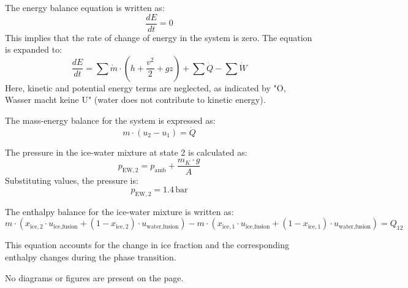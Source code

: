 The energy balance equation is written as:  
\[
\frac{dE}{dt} = 0
\]  
This implies that the rate of change of energy in the system is zero. The equation is expanded to:  
\[
\frac{dE}{dt} = \sum \dot{m} \cdot \left( h + \frac{v^2}{2} + gz \right) + \sum \dot{Q} - \sum \dot{W}
\]  
Here, kinetic and potential energy terms are neglected, as indicated by "O, Wasser macht keine U" (water does not contribute to kinetic energy).  

The mass-energy balance for the system is expressed as:  
\[
m \cdot (u_2 - u_1) = \dot{Q}
\]  

The pressure in the ice-water mixture at state 2 is calculated as:  
\[
p_{\text{EW},2} = p_{\text{amb}} + \frac{m_K \cdot g}{A}
\]  
Substituting values, the pressure is:  
\[
p_{\text{EW},2} = 1.4 \, \text{bar}
\]  

The enthalpy balance for the ice-water mixture is written as:  
\[
m \cdot \left( x_{\text{ice},2} \cdot u_{\text{ice},\text{fusion}} + (1 - x_{\text{ice},2}) \cdot u_{\text{water},\text{fusion}} \right) - m \cdot \left( x_{\text{ice},1} \cdot u_{\text{ice},\text{fusion}} + (1 - x_{\text{ice},1}) \cdot u_{\text{water},\text{fusion}} \right) = Q_{12}
\]  

This equation accounts for the change in ice fraction and the corresponding enthalpy changes during the phase transition.  

No diagrams or figures are present on the page.